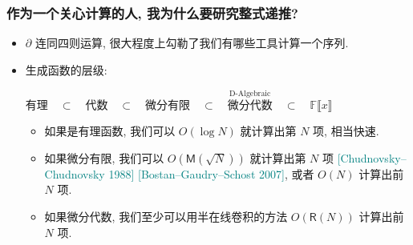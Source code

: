 \documentclass{ctexbeamer}
\newcommand{\cnote}[2][\footnotesize]{\textcolor{teal}{#1[#2]}}
\newcommand{\bbF}{\mathbb F}
\newcommand{\bbZ}{\mathbb Z}
\DeclareMathOperator{\Span}{span}
\DeclareMathOperator{\rmT}{T}
\begin{document}

  



\begin{frame}
  \frametitle{作为一个关心计算的人, 我为什么要研究整式递推?}

  \begin{itemize}
    \item $\partial$ 连同四则运算, 很大程度上勾勒了我们有哪些工具计算一个序列.
    \item 生成函数的层级:
    \begin{center}
      $\text{有理} \quad \subset \quad \text{代数} \quad \subset \quad \text{微分有限} \quad
      \subset \quad \stackrel{\text{D-Algebraic}}{\text{微分代数}} \quad \subset \quad \bbF \llbracket x \rrbracket$
    \end{center}
    \pause
    \begin{itemize}
      \item 如果是有理函数, 我们可以 $O(\log N)$ 就计算出第 $N$ 项, 相当快速.
      \item 如果微分有限, 我们可以 $O(\mathsf M(\sqrt N))$ 就计算出第 $N$ 项
      \cnote{Chudnovsky--Chudnovsky 1988} \cnote{Bostan--Gaudry--Schost 2007}, 或者 $O(N)$ 计算出前 $N$ 项.
      \item 如果微分代数, 我们至少可以用半在线卷积的方法 $O(\mathsf R(N))$ 计算出前 $N$ 项.
    \end{itemize}
  \end{itemize}

\end{frame}
\end{document}
